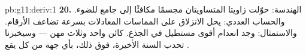 \begin{solution}{pb:g11:deriv:1}
\textbf{20.} الهندسة: حوّلت زاويتا  المتساويتان
مجسمًا مكافئًا إلى جامع للضوء. والحساب العددي: يحل الانزلاق على
المماسات المعادلات بسرعة تضاعف الأرقام.
والاستمثال: وجد انعدام  أقوى مستطيل في
الجذع. كائن واحد وثلاث مهن --- وسيخبرنا تحدب السنة
الأخيرة، فوق ذلك، بأي جهة من كل  يقع .
\end{solution}
